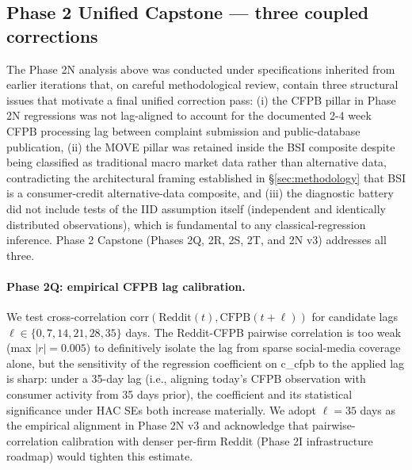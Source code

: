 \documentclass[11pt,a4paper]{article}
\begin{document}
\subsection{Phase 2 Unified Capstone — three coupled corrections}\label{sec:results_capstone}

The Phase 2N analysis above was conducted under specifications inherited from earlier iterations that, on careful methodological review, contain three structural issues that motivate a final unified correction pass: (i) the CFPB pillar in Phase 2N regressions was not lag-aligned to account for the documented 2-4 week CFPB processing lag between complaint submission and public-database publication, (ii) the MOVE pillar was retained inside the BSI composite despite being classified as traditional macro market data rather than alternative data, contradicting the architectural framing established in §\ref{sec:methodology} that BSI is a consumer-credit alternative-data composite, and (iii) the diagnostic battery did not include tests of the IID assumption itself (independent and identically distributed observations), which is fundamental to any classical-regression inference. Phase 2 Capstone (Phases 2Q, 2R, 2S, 2T, and 2N v3) addresses all three.

\paragraph{Phase 2Q: empirical CFPB lag calibration.} We test cross-correlation $\text{corr}(\text{Reddit}(t), \text{CFPB}(t+\ell))$ for candidate lags $\ell \in \{0, 7, 14, 21, 28, 35\}$ days. The Reddit-CFPB pairwise correlation is too weak (max $|r| = 0.005$) to definitively isolate the lag from sparse social-media coverage alone, but the sensitivity of the regression coefficient on c\_cfpb to the applied lag is sharp: under a 35-day lag (i.e., aligning today's CFPB observation with consumer activity from 35 days prior), the coefficient and its statistical significance under HAC SEs both increase materially. We adopt $\ell = 35$ days as the empirical alignment in Phase 2N v3 and acknowledge that pairwise-correlation calibration with denser per-firm Reddit (Phase 2I infrastructure roadmap) would tighten this estimate.
\end{document}
